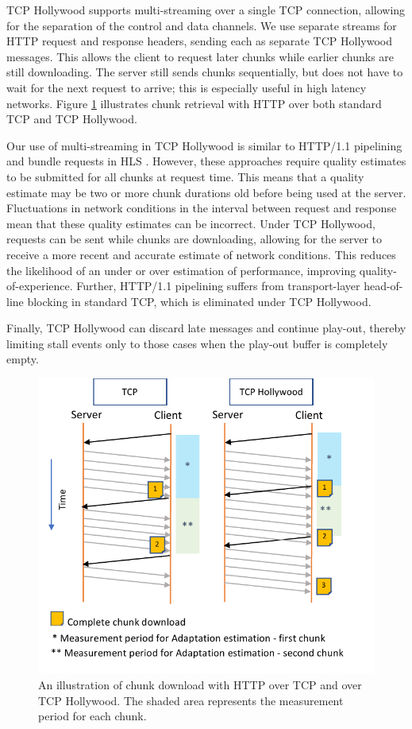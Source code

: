 TCP Hollywood supports multi-streaming over a single TCP connection, allowing for the
separation of the control and data channels. We use separate streams for HTTP request and
response headers, sending each as separate TCP Hollywood messages. This allows the client
to request later chunks while earlier chunks are still downloading. The server still sends
chunks sequentially, but does not have to wait for the next request to arrive; this is
especially useful in high latency networks. Figure \ref{fig:hollywood_download}
illustrates chunk retrieval with HTTP over both standard TCP and TCP Hollywood.

Our use of multi-streaming in TCP Hollywood is similar to HTTP/1.1 pipelining and bundle
requests in HLS \cite{muller2012evaluation}. However, these approaches require quality
estimates to be submitted for all chunks at request time. This means that a quality
estimate may be two or more chunk durations old before being used at the server.
Fluctuations in network conditions in the interval between request and response mean that
these quality estimates can be incorrect. Under TCP Hollywood, requests can be sent while
chunks are downloading, allowing for the server to receive a more recent and accurate
estimate of network conditions. This reduces the likelihood of an under or over estimation
of performance, improving quality-of-experience. Further, HTTP/1.1 pipelining suffers
from transport-layer head-of-line blocking in standard TCP, which is eliminated under TCP Hollywood.

Finally, TCP Hollywood can discard late messages and continue play-out,
thereby limiting stall events only to those cases when the play-out buffer is completely
empty.

\begin{figure}
    \centering
    \includegraphics[width=\columnwidth]{figures/tcph-download.pdf}
    \caption{An illustration of chunk download with HTTP over TCP and over TCP Hollywood. The shaded area represents the measurement period for each chunk. }
    \label{fig:hollywood_download}
\end{figure}

